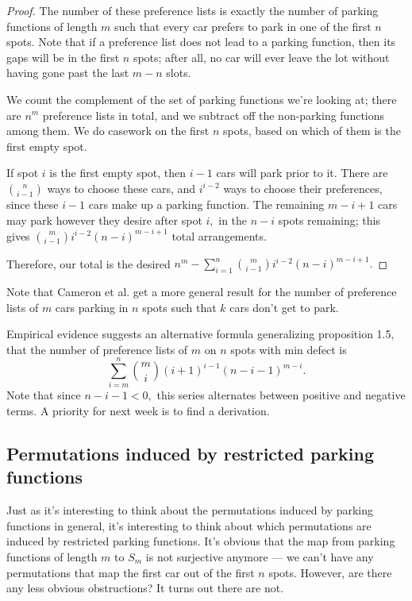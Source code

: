 \begin{proof}
    The number of these preference lists is exactly the number of parking functions of length $m$ such that every car prefers to park in one of the first $n$ spots. Note that if a preference list does not lead to a parking function, then its gaps will be in the first $n$ spots; after all, no car will ever leave the lot without having gone past the last $m-n$ slots.
    
    We count the complement of the set of parking functions we're looking at; there are $n^m$ preference lists in total, and we subtract off the non-parking functions among them. We do casework on the first $n$ spots, based on which of them is the first empty spot.
    
    If spot $i$ is the first empty spot, then $i-1$ cars will park prior to it. There are $\binom{n}{i-1}$ ways to choose these cars, and $i^{i-2}$ ways to choose their preferences, since these $i-1$ cars make up a parking function. The remaining $m-i+1$ cars may park however they desire after spot $i,$ in the $n-i$ spots remaining; this gives $\displaystyle\binom{m}{i-1}i^{i-2}(n-i)^{m-i+1}$ total arrangements.

    Therefore, our total is the desired $\displaystyle n^m-\sum_{i=1}^n \binom{m}{i-1}i^{i-2}(n-i)^{m-i+1}.$
\end{proof}

Note that Cameron et al. get a more general result for the number of preference lists of $m$ cars parking in $n$ spots such that $k$ cars don't get to park. \cite{cameron-johannsen-prellberg-schweitzer-2008}

\begin{remark}
    Empirical evidence suggests an alternative formula generalizing proposition 1.5, that the number of preference lists of $m$ on $n$ spots with min defect is \[\sum_{i=m}^{n}\binom{m}{i}(i+1)^{i-1}(n-i-1)^{m-i}.\]
    Note that since $n-i-1<0,$ this series alternates between positive and negative terms. A priority for next week is to find a derivation.
\end{remark}

\subsection*{Permutations induced by restricted parking functions}

Just as it's interesting to think about the permutations induced by parking functions in general, it's interesting to think about which permutations are induced by restricted parking functions. It's obvious that the map from parking functions of length $m$ to $S_m$ is not surjective anymore --- we can't have any permutations that map the first car out of the first $n$ spots. However, are there any less obvious obstructions? It turns out there are not.

